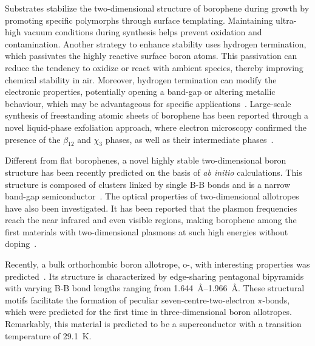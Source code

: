Substrates stabilize the two-dimensional structure of borophene during growth by promoting specific polymorphs through surface templating.
Maintaining ultra-high vacuum conditions during synthesis helps prevent oxidation and contamination.
Another strategy to enhance stability uses hydrogen termination,
which passivates the highly reactive surface boron atoms.
This passivation can reduce the tendency to oxidize or react with ambient species,
thereby improving chemical stability in air.
Moreover, hydrogen termination can modify the electronic properties,
potentially opening a band-gap or altering metallic behaviour,
which may be advantageous for specific applications~\cite{hou2020ultrastable,li2021synthesis}.
Large-scale synthesis of freestanding atomic sheets of borophene has been reported through a novel liquid-phase exfoliation approach,
where electron microscopy confirmed the presence of the $\beta_{12}$ and $\chi_{3}$ phases,
as well as their intermediate phases~\cite{ranjan2019freestanding}.

Different from flat borophenes,
a novel highly stable two-dimensional boron structure has been recently predicted on the basis of \textit{ab initio} calculations.
This structure is composed of  clusters linked by single B-B bonds and is a narrow band-gap semiconductor~\cite{zhang2023novel}.
The optical properties of two-dimensional allotropes have also been investigated.
It has been reported that the plasmon frequencies reach the near infrared and even visible regions,
making borophene among the first materials with two-dimensional plasmons at such high energies without doping~\cite{huang2017}.

Recently, a bulk orthorhombic boron allotrope, o-,
with interesting properties was predicted~\cite{han2023superconducting}.
Its structure is characterized by edge-sharing pentagonal bipyramids with varying B-B bond lengths ranging from \qtyrange{1.644}{1.966}{\angstrom}.
These structural motifs facilitate the formation of peculiar seven-centre-two-electron $\pi$-bonds,
which were predicted for the first time in three-dimensional boron allotropes.
Remarkably, this material is predicted to be a superconductor with a transition temperature of \qty{29.1}{K}.

